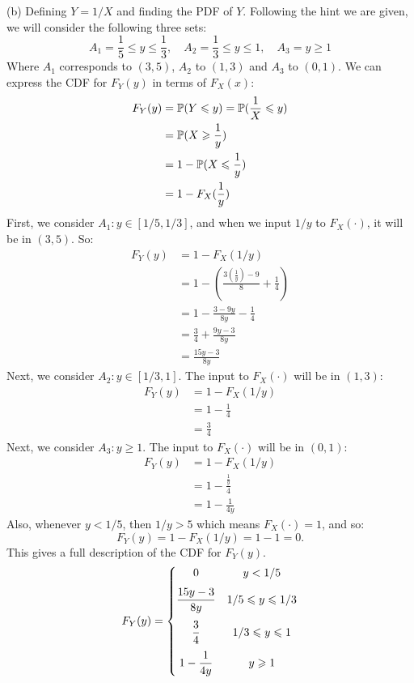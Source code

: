 (b) Defining $Y = 1/X$ and finding the PDF of $Y$. Following the hint we are given,
we will consider the following three sets:
$$
A_1 = \frac{1}{5} \leq y \leq \frac{1}{3},\quad
A_2 = \frac{1}{3} \leq y \leq 1,\quad
A_3 = y\geq 1
$$
Where $A_1$ corresponds to $(3, 5)$, $A_2$ to $(1, 3)$
and $A_3$ to $(0,1)$. We can express the CDF for $F_Y(y)$ in terms
of $F_X(x)$: %
\begin{align*}
    F_Y(y) &= \P(Y\leq y) = \P(\frac{1}{X} \leq y) \\
    &= \P(X \geq \frac{1}{y}) \\
    &= 1 - \P(X\leq \frac{1}{y}) \\
    &= 1 - F_X(\frac{1}{y})
\end{align*}
\newpage\noindent
First, we consider $A_1: y\in[1/5,1/3]$, and when we input $1/y$ to
$F_X(\cdot)$, it will be in $(3, 5)$. So:
\begin{align*}
    F_Y(y) &= 1 - F_X(1/y) \\
    &= 1 - \left(\frac{3(\frac{1}{y}) - 9}{8} + \frac{1}{4}\right) \\
    &= 1 - \frac{3 - 9y}{8y} - \frac{1}{4} \\
    &= \frac{3}{4} + \frac{9y - 3}{8y} \\
    &= \frac{15y - 3}{8y}
\end{align*}
Next, we consider $A_2: y\in[1/3,1]$. The input to $F_X(\cdot)$ will be in $(1, 3)$:
\begin{align*}
    F_Y(y) &= 1 - F_X(1/y) \\
    &= 1 - \frac{1}{4} \\
    &= \frac{3}{4}
\end{align*}
Next, we consider $A_3: y\geq 1$. The input to $F_X(\cdot)$ will be in $(0, 1)$:
\begin{align*}
    F_Y(y) &= 1 - F_X(1/y) \\
    &= 1 - \frac{\frac{1}{y}}{4} \\
    &= 1 - \frac{1}{4y}
\end{align*}
Also, whenever $y<1/5$, then $1/y > 5$ which means $F_X(\cdot) = 1$, and so:
$$
F_Y(y) = 1 - F_X(1/y) = 1 - 1 = 0.
$$
This gives a full description of the CDF for $F_Y(y)$.
$$
F_Y(y) =
\left\{
    \begin{matrix}
        0 & y < 1/5 \\
        \rule{0pt}{20pt}\displaystyle \frac{15y - 3}{8y} & 1/5\leq y\leq 1/3 \\
        \rule{0pt}{20pt}\displaystyle \frac{3}{4} & 1/3\leq y \leq 1 \\
        \rule{0pt}{20pt}\displaystyle 1 - \frac{1}{4y} & y\geq 1
    \end{matrix}
\right.
$$

